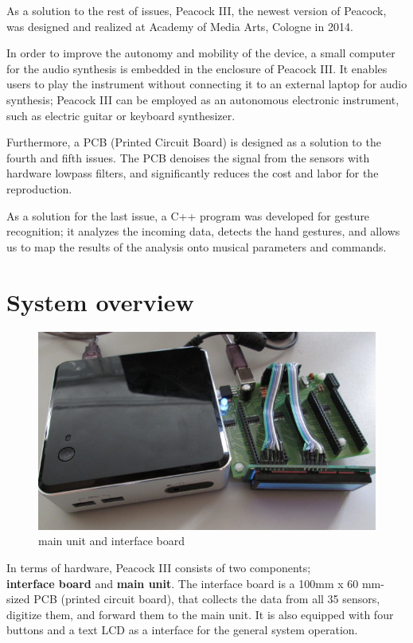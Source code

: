 \documentclass{nime-alternate}
\begin{document}
As a solution to the rest of issues, Peacock III, the newest version of Peacock, was designed and realized at Academy of Media Arts, Cologne in 2014.

In order to improve the autonomy and mobility of the device, a small computer for the audio synthesis is embedded in the enclosure of Peacock III. It enables users to play the instrument without connecting it to an external laptop for audio synthesis; Peacock III can be employed as an autonomous electronic instrument, such as electric guitar or keyboard synthesizer. 

Furthermore, a PCB (Printed Circuit Board) is designed as a solution to the fourth and fifth issues. The PCB  denoises the signal from the sensors with hardware lowpass filters, and significantly reduces the cost and labor for the reproduction. 

As a solution for the last issue, a C++ program was developed for gesture recognition; it analyzes the incoming data, detects the hand gestures, and allows us to map the results of the analysis onto musical parameters and commands.

\section{System overview}
\begin{figure}[htbp]
       \begin{center}
              \includegraphics[scale=0.9]{interface_main.jpg}
       \end{center}
       \caption{main unit and interface board}
       \label{fig:interface_main}
\end{figure}

In terms of hardware, Peacock III consists of two components;\\
\textbf{interface board} and \textbf{main unit}. The interface board is a 100mm x 60 mm-sized PCB (printed circuit board), that collects the data from all 35 sensors, digitize them, and forward them to the main unit. It is also equipped with four buttons and a text LCD as a interface for the general system operation.
\end{document}
